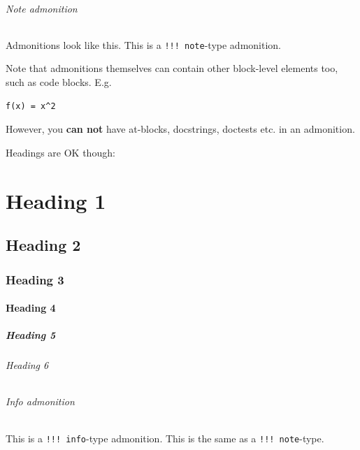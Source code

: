 \subparagraph{Note admonition}\indent



\label{8552106356389139092}{}


\begin{tcolorbox}[toptitle=-1mm,bottomtitle=1mm,colback=admonition-note!50!white,colframe=admonition-note,title=\textbf{{\textquotesingle}note{\textquotesingle} admonition}]
Admonitions look like this. This is a \texttt{!!! note}-type admonition.

Note that admonitions themselves can contain other block-level elements too,
such as code blocks. E.g.


\begin{verbatim}
f(x) = x^2
\end{verbatim}

However, you \textbf{can not} have at-blocks, docstrings, doctests etc. in an admonition.

Headings are OK though:

\chapter{Heading 1}

\section{Heading 2}

\subsection{Heading 3}

\subsubsection{Heading 4}

\paragraph{Heading 5}\indent

\subparagraph{Heading 6}\indent

\end{tcolorbox}


\subparagraph{Info admonition}\indent



\label{17093744537736368990}{}


\begin{tcolorbox}[toptitle=-1mm,bottomtitle=1mm,colback=admonition-info!50!white,colframe=admonition-info,title=\textbf{{\textquotesingle}info{\textquotesingle} admonition}]
This is a \texttt{!!! info}-type admonition. This is the same as a \texttt{!!! note}-type.

\end{tcolorbox}


